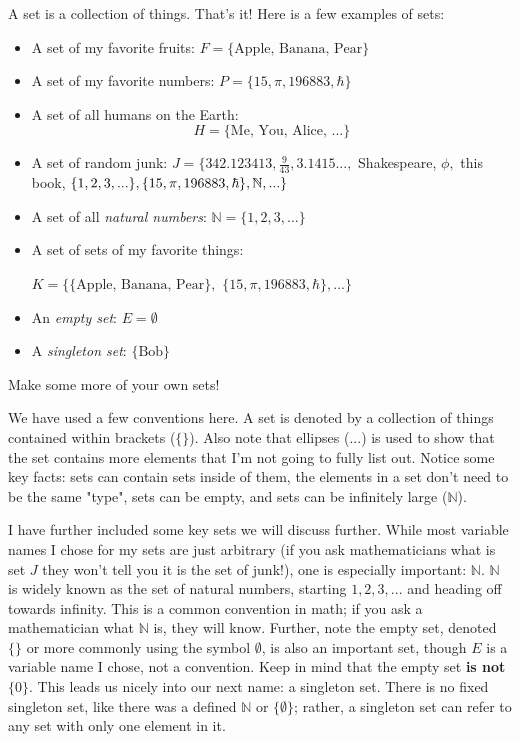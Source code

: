 A set is a collection of things. That's it! Here is a few examples of sets:
\begin{itemize}
    \item A set of my favorite fruits: $F = \{ \text{Apple, Banana, Pear}\}$
    \item A set of my favorite numbers: $P = \{ 15, \pi, 196883,  \hbar\}$
    \item A set of all humans on the Earth: 
    \[H = \{ \text{Me, You, Alice, ...}\}\]
    \item A set of random junk: $J = \{ 342.123413, \frac{9}{43}, 3.1415...,$ Shakespeare, $\phi,$ this book, $\{1, 2, 3, ... \}, \\ \{ 15, \pi, 196883, \hbar\}, \mathbb{N}, ... \}$
    \item A set of all \emph{natural numbers}: $\mathbb{N} = \{ 1, 2, 3, ... \}$
    \item A set of sets of my favorite things: 
    
    \noindent $K = \{ \{ \text{Apple, Banana, Pear}\},$
    $\{ 15, \pi, 196883, \hbar\}, ...\}$
    \item An \emph{empty set}: $E = \emptyset$
    \item A \emph{singleton set}: $\{ \text{Bob}\}$
\end{itemize}

\begin{exercise}
    Make some more of your own sets! 
\end{exercise}

We have used a few conventions here. A set is denoted by a collection of things contained within brackets ($\{ \}$). Also note that ellipses ($...$) is used to show that the set contains more elements that I'm not going to fully list out. Notice some key facts: sets can contain sets inside of them, the elements in a set don't need to be the same "type", sets can be empty, and sets can be infinitely large ($\mathbb{N}$). 

I have further included some key sets we will discuss further. While most variable names I chose for my sets are just arbitrary (if you ask mathematicians what is set $J$ they won't tell you it is the set of junk!), one is especially important: $\mathbb{N}$. $\mathbb{N}$ is widely known as the set of natural numbers, starting $1, 2, 3, ...$ and heading off towards infinity. This is a common convention in math; if you ask a mathematician what $\mathbb{N}$ is, they will know. Further, note the empty set, denoted $\{ \}$ or more commonly using the symbol $\emptyset$, is also an important set, though $E$ is a variable name I chose, not a convention. Keep in mind that the empty set \textbf{is not} $\{ 0 \}$. This leads us nicely into our next name: a singleton set. There is no fixed singleton set, like there was a defined $\mathbb{N}$ or $\{ \emptyset \}$; rather, a singleton set can refer to any set with only one element in it. 

